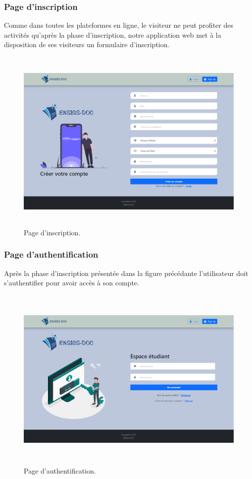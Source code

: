 \documentclass{article}
\begin{document}
{\subsubsection{Page d'inscription}{Comme dans toutes les plateformes en ligne, le visiteur ne peut profiter des activités qu'après la phase d'inscription, notre application web met à la disposition de ses visiteurs un formulaire d'inscription.
}
\begin{figure}[H]
    \centering
    \includegraphics[width=17cm,height=9cm]{enregistrement.png}
    \caption{Page d'inscription.}
    \label{Page d'inscription.}
\end{figure}
\subsubsection{Page d'authentification}{Après la phase d'inscription présentée dans la figure précédante l'utilisateur doit s'authentifier pour avoir accès à son compte.
}

\begin{figure}[H]
    \centering
    \includegraphics[width=17cm,height=9cm]{login.png}
    \caption{Page d'authentification.}
    \label{Page d'authentification.}
\end{figure}
}
\end{document}
